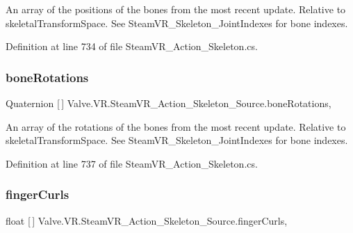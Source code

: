 An array of the positions of the bones from the most recent update. Relative to skeletal\+Transform\+Space. See Steam\+V\+R\+\_\+\+Skeleton\+\_\+\+Joint\+Indexes for bone indexes. 



Definition at line 734 of file Steam\+V\+R\+\_\+\+Action\+\_\+\+Skeleton.\+cs.

\mbox{\label{class_valve_1_1_v_r_1_1_steam_v_r___action___skeleton___source_a808b69ed4642a20cd86db74953e11868}} 
\subsubsection{\texorpdfstring{boneRotations}{boneRotations}}
{\footnotesize\ttfamily Quaternion \mbox{[}$\,$\mbox{]} Valve.\+V\+R.\+Steam\+V\+R\+\_\+\+Action\+\_\+\+Skeleton\+\_\+\+Source.\+bone\+Rotations\hspace{0.3cm}{\ttfamily [get]}, {}}



An array of the rotations of the bones from the most recent update. Relative to skeletal\+Transform\+Space. See Steam\+V\+R\+\_\+\+Skeleton\+\_\+\+Joint\+Indexes for bone indexes. 



Definition at line 737 of file Steam\+V\+R\+\_\+\+Action\+\_\+\+Skeleton.\+cs.

\mbox{\label{class_valve_1_1_v_r_1_1_steam_v_r___action___skeleton___source_a15a77d357e4e87b039735a2eb3cf9ea1}} 
\subsubsection{\texorpdfstring{fingerCurls}{fingerCurls}}
{\footnotesize\ttfamily float \mbox{[}$\,$\mbox{]} Valve.\+V\+R.\+Steam\+V\+R\+\_\+\+Action\+\_\+\+Skeleton\+\_\+\+Source.\+finger\+Curls\hspace{0.3cm}{\ttfamily [get]}, {}}



